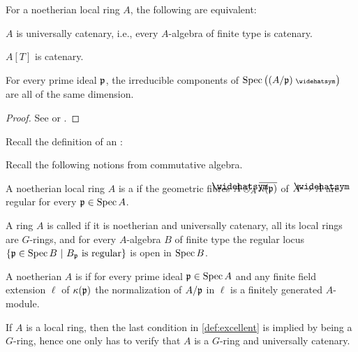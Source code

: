 \documentclass[a4paper, 10pt, oneside, DIV=9, chapterprefix=true, numbers=enddot, bibliography=totoc]{scrbook}
\begin{document}
\begin{thm}[Ratliff]\label{thm:universallyCatenary}
	For a noetherian local ring $A$, the following are equivalent:
	\begin{alphanumerate}
		\item $A$ is universally catenary, i.e., every $A$-algebra of finite type is catenary.
		\item $A[T]$ is catenary.
		\item For every prime ideal $\mathfrak{p}$, the irreducible components of $\Spec \big((A/\pp)^\complete\big)$ are all of the same dimension.
	\end{alphanumerate}
\end{thm}
\begin{proof}
	See \cite[Theorem~31.7]{matsumuraCRT} or \cite[]{stacks-project}.
\end{proof}
Recall the definition of an :
\begin{defi}\label{def:excellent}
	Recall the following notions from commutative algebra.
	\begin{alphanumerate}
		\item A noetherian local ring $A$ is a  if the geometric fibres $\roof{A}\otimes_A\ov{\kappa(\pp)}$ of $A\morphism \roof{A}$ are regular for every $\mathfrak{p}\in\operatorname{Spec} A$.
		\item A ring $A$ is called  if it is noetherian and universally catenary, all its local rings are $G$-rings, and for every $A$-algebra $B$ of finite type the regular locus $\left\{\mathfrak{p}\in\operatorname{Spec} B\ \middle|\  B_{\mathfrak{p}}\text{ is regular}\right\}$ is open in $\operatorname{Spec} B$.
		\item A noetherian $A$ is  if for every prime ideal $\mathfrak{p}\in\operatorname{Spec} A$ and any finite field extension $\ell$ of $\kappa(\mathfrak{p})$ the normalization of $A/\mathfrak{p}$ in $\ell$ is a finitely generated $A$-module.
	\end{alphanumerate}
\end{defi}
If $A$ is a local ring, then the last condition in \cref{def:excellent} is implied by being a $G$-ring, hence one only has to verify that $A$ is a $G$-ring and universally catenary.
\end{document}
